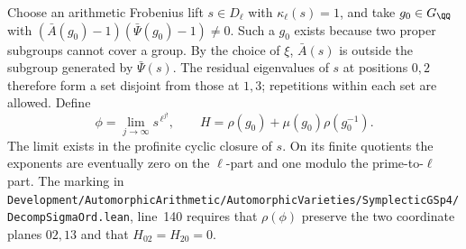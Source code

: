 \documentclass[a4paper,11pt]{article}
\theoremstyle{definition}
\theoremstyle{remark}
\newcommand{\srcloc}[2]{{\small\nolinkurl{#1.lean}}, line~#2}
\numberwithin{equation}{section}
\begin{document}
Choose an arithmetic Frobenius lift \(s\in D_\ell\) with
\(\kappa_\ell(s)=1\), and take \(g_0\in G_{\QQ}\) with
\((\bar A(g_0)-1)(\bar\Psi(g_0)-1)\ne0\). Such a \(g_0\)
exists because two proper subgroups cannot cover a group.
By the choice of \(\xi\), \(\bar A(s)\) is outside the subgroup
generated by \(\bar\Psi(s)\). The residual eigenvalues of \(s\)
at positions \(0,2\) therefore form a set disjoint from those
at \(1,3\); repetitions within each set are allowed. Define
\[
       \phi=\lim_{j\to\infty}s^{\,\ell^{j!}},
       \qquad H=\rho(g_0)+\mu(g_0)\rho(g_0^{-1}).
\]
The limit exists in the profinite cyclic closure of \(s\).
On its finite quotients the exponents are eventually zero on
the \(\ell\)-part and one modulo the prime-to-\(\ell\) part.
The marking in
\srcloc{Development/AutomorphicArithmetic/AutomorphicVarieties/SymplecticGSp4/DecompSigmaOrd}{140}
requires that \(\rho(\phi)\) preserve the two coordinate planes
\(02,13\) and that \(H_{02}=H_{20}=0\).
\end{document}
